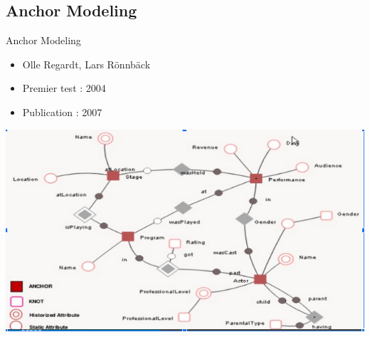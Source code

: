 \subsection{Anchor Modeling}
\begin{frame}{Anchor Modeling}
\begin{itemize}
    \item Olle Regardt, Lars Rönnbäck
    \item Premier test : 2004
    \item Publication : 2007
\end{itemize}
\centering
\includegraphics[scale=0.55]{figures/anchor2.PNG}
\end{frame}